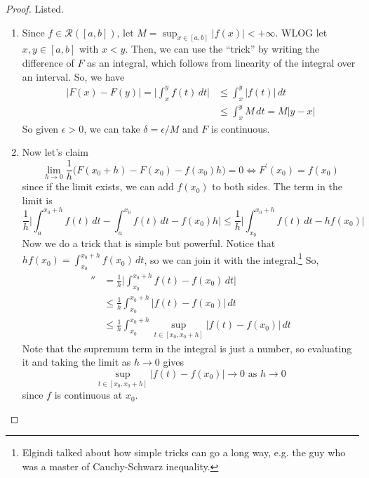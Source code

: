   \begin{proof} 
    Listed. 
    \begin{enumerate}
      \item Since $f \in \mathcal{R}([a, b])$, let $M = \sup_{x \in [a, b]} |f(x)| < + \infty$. WLOG let $x, y \in [a, b]$ with $x < y$. Then, we can use the ``trick'' by writing the difference of $F$ as an integral, which follows from linearity of the integral over an interval. So, we have 
      \begin{align}
        |F(x) - F(y)| = \bigg| \int_x^y f(t) \, dt \bigg| & \leq \int_x^y |f(t)| \,dt \\
                                                          & \leq \int_x^y M \,dt  = M |y - x|
      \end{align}
      So given $\epsilon > 0$, we can take $\delta = \epsilon/M$ and $F$ is continuous. 

      \item Now let's claim 
        \begin{equation}
          \lim_{h \to 0} \frac{1}{h} \big( F(x_0 + h) - F(x_0) - f(x_0) h \big) = 0 \iff F^\prime (x_0) = f(x_0)
        \end{equation} 
        since if the limit exists, we can add $f(x_0)$ to both sides. The term in the limit is 
        \begin{equation}
          \frac{1}{h} \bigg| \int_a^{x_0 + h} f(t) \,dt - \int_a^{x_0} f(t) \,dt - f(x_0) h \bigg| \leq \frac{1}{h} \bigg| \int_{x_0}^{x_0 + h} f(t) \,dt - h f(x_0) \bigg|
        \end{equation}
        Now we do a trick that is simple but powerful. Notice that $h f(x_0) = \int_{x_0}^{x_0 + h} f(x_0) \,dt$, so we can join it with the integral.\footnote{Elgindi talked about how simple tricks can go a long way, e.g. the guy who was a master of Cauchy-Schwarz inequality.} So, 
        \begin{align}
          '' & = \frac{1}{h} \bigg| \int_{x_0}^{x_0 + h} f(t) - f(x_0) \,dt \bigg| \\ 
             & \leq \frac{1}{h} \int_{x_0}^{x_0 + h} \big| f(t) - f(x_0) \big| \,dt \\ 
             & \leq \frac{1}{h} \int_{x_0}^{x_0 + h} \sup_{t \in [x_0, x_0 + h]} \big| f(t) - f(x_0) \big| \,dt 
        \end{align} 
        Note that the supremum term in the integral is just a number, so evaluating it and taking the limit as $h \to 0$ gives 
        \begin{equation}
          \sup_{t \in [x_0, x_0 + h]} |f(t) - f(x_0)| \to 0 \text{ as } h \to 0
        \end{equation}
        since $f$ is continuous at $x_0$. 
    \end{enumerate}
  \end{proof}

